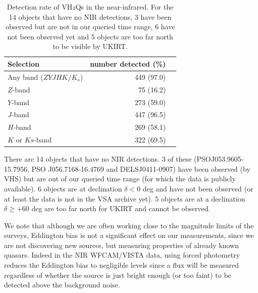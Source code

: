 \documentclass[usenatbib]{mnras}
\begin{document}
\begin{table}
  \centering
  \begin{tabular}{l r l}
    \hline  \hline
    Selection   & number detected (\%) \\
    \hline  
    Any band ($ZYJHK/K_{s}$)    &  449  (97.0) \\
    $Z$-band                            &  75  (16.2) \\
    $Y$-band                            &  273  (59.0) \\
    $J$-band                              &  447  (96.5) \\
    $H$-band                            &  269  (58.1) \\
    $K$ or $Ks$-band                &  322  (69.5) \\
    \hline  \hline
  \end{tabular}
  \caption{Detection rate of VH$z$Qs in the near-infrared. 
For the 14 objects that have no NIR detections, 3 have 
been observed but are not in our queried time range, 6 have 
not been observed yet and 5 objects are too far north to be visible 
by UKIRT. }
  \label{tab:nir_detection}
\end{table}

There are 14 objects that have no NIR detections. 3 of these
(PSOJ053.9605-15.7956, PSO J056.7168-16.4769 and DELSJ0411-0907) have
been observed (by VHS) but are out of our queried time range (for
which the data is publicly available). 6 objects are at declination
$\delta<0$ deg and have not been observed (or at least the data is not
in the VSA archive yet). 5 objects are at a declination $\delta \geq
+60$ deg are too far north for UKIRT and cannot be observed.

We note that although we are often working close to the magnitude
limits of the surveys, Eddington bias is not a significant effect on
our measurements, since we are not discovering new sources, but
measuring properties of already known quasars. Indeed in the NIR
WFCAM/VISTA data, using forced photometry reduces the Eddington bias
to negligible levels since a flux will be measured regardless of
whether the source is just bright enough (or too faint) to be detected
above the background noise.
\end{document}
